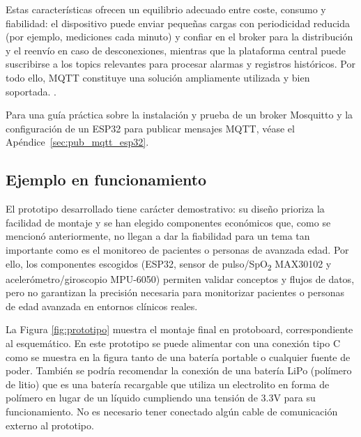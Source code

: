 \documentclass[12pt, a4paper]{article}
\begin{document}
	Estas características ofrecen un equilibrio adecuado entre coste, consumo y fiabilidad: el dispositivo puede enviar pequeñas cargas con periodicidad reducida (por ejemplo, mediciones cada minuto) y confiar en el broker para la distribución y el reenvío en caso de desconexiones, mientras que la plataforma central puede suscribirse a los topics relevantes para procesar alarmas y registros históricos. Por todo ello, MQTT constituye una solución ampliamente utilizada y bien soportada. \cite{mosquitto,hernandez2024}.

	Para una guía práctica sobre la instalación y prueba de un broker Mosquitto y la configuración de un ESP32 para publicar mensajes MQTT, véase el Apéndice~\ref{sec:pub_mqtt_esp32}.
	
	
	
	\subsection{Ejemplo en funcionamiento}
	
	
	El prototipo desarrollado tiene carácter demostrativo: su diseño prioriza la facilidad de montaje y se han elegido componentes económicos que, como se mencionó anteriormente, no llegan a dar la fiabilidad para un tema tan importante como es el monitoreo de pacientes o personas de avanzada edad. Por ello, los componentes escogidos (ESP32, sensor de pulso/SpO\textsubscript{2} MAX30102 y acelerómetro/giroscopio MPU-6050) permiten validar conceptos y flujos de datos, pero no garantizan la precisión necesaria para monitorizar pacientes o personas de edad avanzada en entornos clínicos reales.
	
	La Figura \ref{fig:prototipo} muestra el montaje final en protoboard, correspondiente al esquemático. En este prototipo se puede alimentar con una conexión tipo C como se muestra en la figura tanto de una batería portable o cualquier fuente de poder. También se podría recomendar la conexión  de una batería LiPo (polímero de litio) que es una batería recargable que utiliza un electrolito en forma de polímero en lugar de un líquido cumpliendo  una tensión de 3.3V para su funcionamiento. No es necesario tener conectado algún cable de comunicación externo al prototipo.
	
\end{document}
